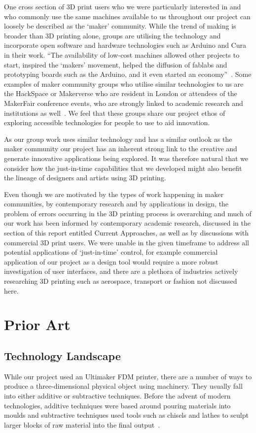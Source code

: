 \documentclass[pdftex, 11pt]{report} %
\begin{document}
One cross section of 3D print users who we were particularly interested in and who commonly use the same machines available to us throughout our project can loosely be described as the `maker' community. While the trend of making is broader than 3D printing alone, groups are utilising the technology and incorporate open software and hardware technologies such as Arduino and Cura in their work. ``The availability of low-cost machines allowed other projects to start, inspired the `makers' movement, helped the diffusion of fablabs and prototyping boards such as the Arduino, and it even started an economy''~\cite{Ranellucci2013}. Some examples of maker community groups who utilise similar technologies to us are the HackSpace or Makerverse who are resident in London or attendees of the MakerFair conference events, who are strongly linked to academic research and institutions as well~\cite{MakerMediaInc2014}. We feel that these groups share our project ethos of exploring accessible technologies for people to use to aid innovation. 

As our group work uses similar technology and has a similar outlook as the maker community our project has an inherent strong link to the creative and generate innovative applications being explored. It was therefore natural that we consider how the just-in-time capabilities that we developed might also benefit the lineage of designers and artists using 3D printing.  

Even though we are motivated by the types of work happening in maker communities, by contemporary research and by applications in design, the problem of errors occurring in the 3D printing process is overarching and much of our work has been informed by contemporary academic research, discussed in the section of this report entitled Current Approaches, as well as by discussions with commercial 3D print users. We were unable in the given timeframe to address all potential applications of `just-in-time' control, for example commercial application of our project as a design tool would require a more robust investigation of user interfaces, and there are a plethora of industries actively researching 3D printing such as aerospace, transport or fashion not discussed here.


\chapter{Prior Art}
\section{Technology Landscape}
\label{section:TechnologyLandscape}
While our project used an Ultimaker FDM printer, there are a number of ways to produce a three-dimensional physical object using machinery. They usually fall into either additive or subtractive techniques. Before the advent of modern technologies, additive techniques were based around pouring materials into moulds and subtractive techniques used tools such as chisels and lathes to sculpt larger blocks of raw material into the final output~\cite{Guo2013}.
\end{document}
